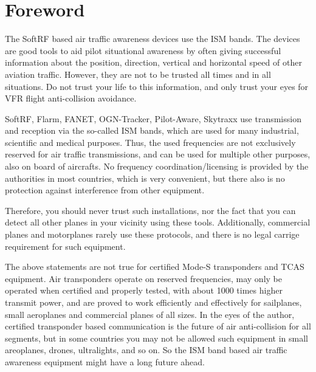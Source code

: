 \documentclass[11pt,a4paper]{article}
\begin{document}
\section{Foreword}
The SoftRF based air traffic awareness devices use the ISM bands. The devices are good tools to aid pilot situational awareness by often giving successful information about the position, direction, vertical and horizontal speed of other aviation traffic. However, they are not to be trusted all times and in all situations. Do not trust your life to this information, and only trust your eyes for VFR flight anti-collision avoidance.

SoftRF, Flarm, FANET, OGN-Tracker, Pilot-Aware, Skytraxx use transmission and reception via the so-called ISM bands, which are used for many industrial, scientific and medical purposes. Thus, the used frequencies are not exclusively reserved for air traffic transmissions, and can be used for multiple other purposes, also on board of aircrafts. No frequency coordination/licensing is provided by the authorities in most countries, which is very convenient, but there also is no protection against interference from other equipment.

\begin{center}
\end{center}

Therefore, you should never trust such installations, nor the fact that you can detect all other planes in your vicinity using these tools. Additionally, commercial planes and motorplanes rarely use these protocols, and there is no legal carrige requirement for such equipment.

The above statements are not true for certified Mode-S transponders and TCAS equipment. Air transponders operate on reserved frequencies, may only be operated when certified and properly tested, with about 1000 times higher transmit power, and are proved to work efficiently and effectively for sailplanes, small aeroplanes and commercial planes of all sizes. In the eyes of the author, certified transponder based communication is the future of air anti-collision for all segments, but in some countries you may not be allowed such equipment in small areoplanes, drones, ultralights, and so on. So the ISM band based air traffic awareness equipment might have a long future ahead.
\end{document}
